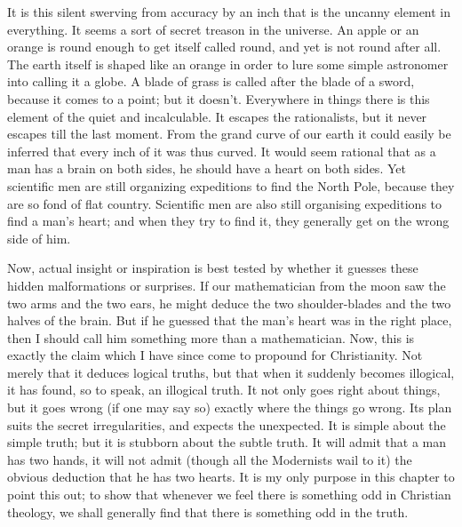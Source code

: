 \documentclass{book}
\begin{document}
It is this silent swerving from accuracy by an inch that is the uncanny element in everything. It seems a sort of secret treason in the universe. An apple or an orange is round enough to get itself called round, and yet is not round after all. The earth itself is shaped like an orange in order to lure some simple astronomer into calling it a globe. A blade of grass is called after the blade of a sword, because it comes to a point; but it doesn’t. Everywhere in things there is this element of the quiet and incalculable. It escapes the rationalists, but it never escapes till the last moment. From the grand curve of our earth it could easily be inferred that every inch of it was thus curved. It would seem rational that as a man has a brain on both sides, he should have a heart on both sides. Yet scientific men are still organizing expeditions to find the North Pole, because they are so fond of flat country. Scientific men are also still organising expeditions to find a man’s heart; and when they try to find it, they generally get on the wrong side of him.

Now, actual insight or inspiration is best tested by whether it guesses these hidden malformations or surprises. If our mathematician from the moon saw the two arms and the two ears, he might deduce the two shoulder-blades and the two halves of the brain. But if he guessed that the man’s heart was in the right place, then I should call him something more than a mathematician. Now, this is exactly the claim which I have since come to propound for Christianity. Not merely that it deduces logical truths, but that when it suddenly becomes illogical, it has found, so to speak, an illogical truth. It not only goes right about things, but it goes wrong (if one may say so) exactly where the things go wrong. Its plan suits the secret irregularities, and expects the unexpected. It is simple about the simple truth; but it is stubborn about the subtle truth. It will admit that a man has two hands, it will not admit (though all the Modernists wail to it) the obvious deduction that he has two hearts. It is my only purpose in this chapter to point this out; to show that whenever we feel there is something odd in Christian theology, we shall generally find that there is something odd in the truth.
\end{document}
